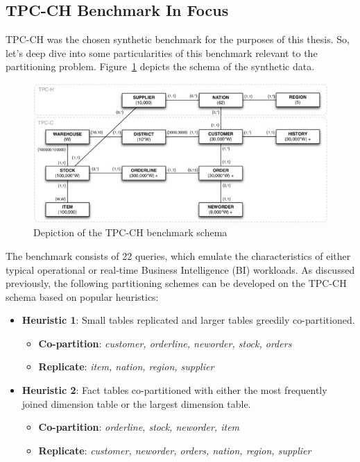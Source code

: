 \subsection{TPC-CH Benchmark In Focus}
TPC-CH was the chosen synthetic benchmark for the purposes of this thesis. So, let's deep dive into some particularities of this benchmark relevant to the partitioning problem. Figure~\ref{fig:tpc-ch-benchmark} depicts the schema of the synthetic data.

\begin{figure}[h]
  \centering
  \includegraphics[width=\linewidth]{figures/ch-benchmark-schema.jpg}
  \caption{Depiction of the TPC-CH benchmark schema \cite{tpc-ch-schema}}
  \label{fig:tpc-ch-benchmark}
\end{figure}

The benchmark consists of 22 queries, which emulate the characteristics of either typical operational or real-time Business Intelligence (BI) workloads. As discussed previously, the following partitioning schemes can be developed on the TPC-CH schema based on popular heuristics:

\begin{itemize}
    \item \textbf{Heuristic 1}: Small tables replicated and larger tables greedily co-partitioned.
    \begin{itemize}
        \item \textbf{Co-partition}: \textit{customer, orderline, neworder, stock, orders}
        \item \textbf{Replicate}: \textit{item, nation, region, supplier}
    \end{itemize}
    \item \textbf{Heuristic 2}: Fact tables co-partitioned with either the most frequently joined dimension table or the largest dimension table.
    \begin{itemize}
        \item \textbf{Co-partition}: \textit{orderline, stock, neworder, item}
        \item \textbf{Replicate}: \textit{customer, neworder, orders, nation, region, supplier}
    \end{itemize}
\end{itemize}

